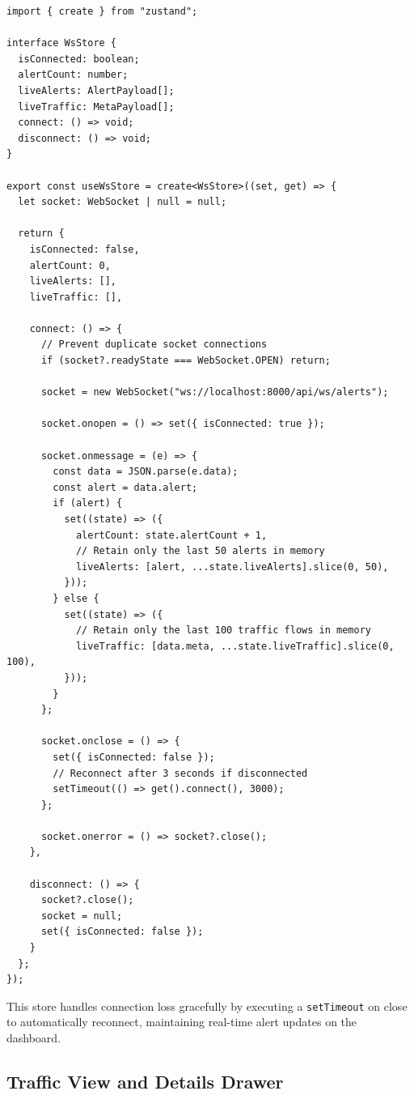 \documentclass[12pt,a4paper]{report}
\begin{document}
\begin{lstlisting}[style=typescriptstyle, caption={Zustand WebSocket store implementation}]
import { create } from "zustand";

interface WsStore {
  isConnected: boolean;
  alertCount: number;
  liveAlerts: AlertPayload[];
  liveTraffic: MetaPayload[];
  connect: () => void;
  disconnect: () => void;
}

export const useWsStore = create<WsStore>((set, get) => {
  let socket: WebSocket | null = null;

  return {
    isConnected: false,
    alertCount: 0,
    liveAlerts: [],
    liveTraffic: [],

    connect: () => {
      // Prevent duplicate socket connections
      if (socket?.readyState === WebSocket.OPEN) return;

      socket = new WebSocket("ws://localhost:8000/api/ws/alerts");

      socket.onopen = () => set({ isConnected: true });

      socket.onmessage = (e) => {
        const data = JSON.parse(e.data);
        const alert = data.alert;
        if (alert) {
          set((state) => ({
            alertCount: state.alertCount + 1,
            // Retain only the last 50 alerts in memory
            liveAlerts: [alert, ...state.liveAlerts].slice(0, 50),
          }));
        } else {
          set((state) => ({
            // Retain only the last 100 traffic flows in memory
            liveTraffic: [data.meta, ...state.liveTraffic].slice(0, 100),
          }));
        }
      };

      socket.onclose = () => {
        set({ isConnected: false });
        // Reconnect after 3 seconds if disconnected
        setTimeout(() => get().connect(), 3000);
      };

      socket.onerror = () => socket?.close();
    },

    disconnect: () => {
      socket?.close();
      socket = null;
      set({ isConnected: false });
    }
  };
});
\end{lstlisting}

This store handles connection loss gracefully by executing a \texttt{setTimeout} on close to automatically reconnect, maintaining real-time alert updates on the dashboard.

\subsection{Traffic View and Details Drawer}
\end{document}
